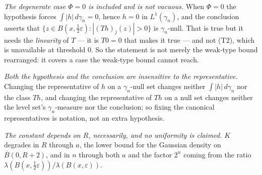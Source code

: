 \begin{lemma}
\emph{The degenerate case $\Phi = 0$ is included and is not vacuous.}  When
$\Phi = 0$ the hypothesis forces $\int|h|\,d\gamma_n = 0$, hence $h = 0$ in
$L^1(\gamma_n)$, and the conclusion asserts that
$\{z \in B(x,\tfrac12\varepsilon) : |(Th)_j(z)| > 0\}$ is $\gamma_n$-null.
That is true but it needs the \emph{linearity} of $T$ --- it is $T0 = 0$ that
makes it true --- and not (T2), which is unavailable at threshold $0$.  So the
statement is not merely the weak-type bound rearranged: it covers a case the
weak-type bound cannot reach.

\emph{Both the hypothesis and the conclusion are insensitive to the
representative.}  Changing the representative of $h$ on a $\gamma_n$-null set
changes neither $\int|h|\,d\gamma_n$ nor the class $Th$, and changing the
representative of $Th$ on a null set changes neither the level set's
$\gamma_n$-measure nor the conclusion; so fixing the canonical representatives
is notation, not an extra hypothesis.

\emph{The constant depends on $R$, necessarily, and no uniformity is claimed.}
$K$ degrades in $R$ through $a$, the lower bound for the Gaussian density on
$\overline B(0,R+2)$, and in $n$ through both $a$ and the factor $2^n$ coming
from the ratio $\lambda(B(x,\tfrac12\varepsilon))/\lambda(B(x,\varepsilon))$.
\end{lemma}
